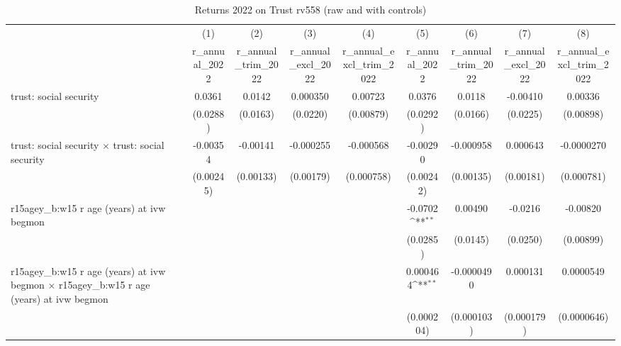 \begin{table}[htbp]\centering
\def\sym#1{\ifmmode^{#1}\else\(^{#1}\)\fi}
\caption{Returns 2022 on Trust rv558 (raw and with controls)}
\begin{tabular}{l*{8}{c}}
\toprule
                &\multicolumn{1}{c}{(1)}&\multicolumn{1}{c}{(2)}&\multicolumn{1}{c}{(3)}&\multicolumn{1}{c}{(4)}&\multicolumn{1}{c}{(5)}&\multicolumn{1}{c}{(6)}&\multicolumn{1}{c}{(7)}&\multicolumn{1}{c}{(8)}\\
                &\multicolumn{1}{c}{r\_annual\_2022}&\multicolumn{1}{c}{r\_annual\_trim\_2022}&\multicolumn{1}{c}{r\_annual\_excl\_2022}&\multicolumn{1}{c}{r\_annual\_excl\_trim\_2022}&\multicolumn{1}{c}{r\_annual\_2022}&\multicolumn{1}{c}{r\_annual\_trim\_2022}&\multicolumn{1}{c}{r\_annual\_excl\_2022}&\multicolumn{1}{c}{r\_annual\_excl\_trim\_2022}\\
\midrule
trust: social security&   0.0361         &   0.0142         & 0.000350         &  0.00723         &   0.0376         &   0.0118         & -0.00410         &  0.00336         \\
                & (0.0288)         & (0.0163)         & (0.0220)         &(0.00879)         & (0.0292)         & (0.0166)         & (0.0225)         &(0.00898)         \\
\addlinespace
trust: social security $\times$ trust: social security& -0.00354         & -0.00141         &-0.000255         &-0.000568         & -0.00290         &-0.000958         & 0.000643         &-0.0000270         \\
                &(0.00245)         &(0.00133)         &(0.00179)         &(0.000758)         &(0.00242)         &(0.00135)         &(0.00181)         &(0.000781)         \\
\addlinespace
r15agey\_b:w15 r age (years) at ivw begmon&                  &                  &                  &                  &  -0.0702\sym{**} &  0.00490         &  -0.0216         & -0.00820         \\
                &                  &                  &                  &                  & (0.0285)         & (0.0145)         & (0.0250)         &(0.00899)         \\
\addlinespace
r15agey\_b:w15 r age (years) at ivw begmon $\times$ r15agey\_b:w15 r age (years) at ivw begmon&                  &                  &                  &                  & 0.000464\sym{**} &-0.0000490         & 0.000131         &0.0000549         \\
                &                  &                  &                  &                  &(0.000204)         &(0.000103)         &(0.000179)         &(0.0000646)         \\

\end{tabular}
\end{table}
